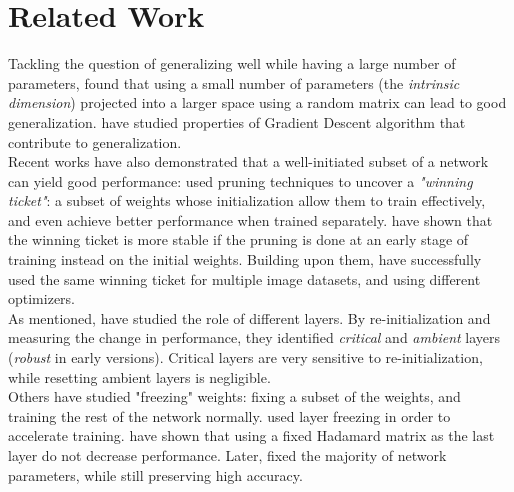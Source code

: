 \documentclass{article}
\begin{document}
\section{Related Work}\label{relatedWork}
Tackling the question of generalizing well while having a large number of parameters, \cite{intrinsic} found that using a small number of parameters (the \textit{intrinsic dimension}) projected into a larger space using a random matrix can lead to good generalization. \cite{sgdAlign} have studied properties of Gradient Descent algorithm that contribute to generalization.\\
Recent works have also demonstrated that a well-initiated subset of a network can yield good performance: \cite{frankle2018lottery} used pruning techniques to uncover a \textit{"winning ticket"}: a subset of weights whose initialization allow them to train effectively, and even achieve better performance when trained separately. \cite{lotteryAtScale} have shown that the winning ticket is more stable if the pruning is done at an early stage of training instead on the initial weights. Building upon them, \cite{generalizingLottery} have successfully used the same winning ticket for multiple image datasets, and using different optimizers.\\
As mentioned, \cite{allLayers} have studied the role of different layers. By re-initialization and measuring the change in performance, they identified \textit{critical} and \textit{ambient} layers (\textit{robust} in early versions). Critical layers are very sensitive to re-initialization, while resetting ambient layers is negligible.\\
Others have studied "freezing" weights: fixing a subset of the weights, and training the rest of the network normally. \cite{freezeout} used layer freezing in order to accelerate training. \cite{fixLastLayerToHadamard} have shown that using a fixed Hadamard matrix as the last layer do not decrease performance. Later, \cite{learningNothing} fixed the majority of network parameters, while still preserving high accuracy. 
\end{document}
